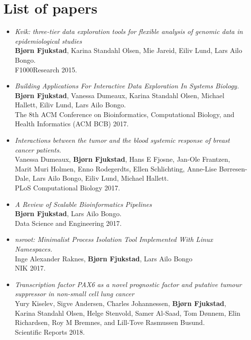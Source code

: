 \section{List of papers} 
\begin{itemize}
    \item
        \emph{Kvik: three-tier data exploration tools for flexible analysis of
        genomic data in epidemiological studies}
        \\
        \textbf{Bjørn Fjukstad}, Karina Standahl Olsen, Mie Jareid, Eiliv Lund,
        Lars Ailo Bongo. 
        \\ 
        F1000Research 2015.
        
    \item 
        \emph{Building Applications For Interactive Data Exploration In Systems
        Biology.}
        \\
        \textbf{Bjørn Fjukstad}, Vanessa Dumeaux, Karina Standahl Olsen, Michael
        Hallett, Eiliv Lund, Lars Ailo Bongo.  
        \\ 
        The 8th ACM Conference on Bioinformatics, Computational Biology, and
        Health Informatics (ACM BCB) 2017.

    \item 
        \emph{Interactions between the tumor and the blood systemic response of
        breast cancer patients.}
        \\ 
        Vanessa Dumeaux, \textbf{Bjørn Fjukstad}, Hans E Fjosne, Jan-Ole
        Frantzen, Marit Muri Holmen, Enno Rodegerdts, Ellen Schlichting,
        Anne-Lise Børresen-Dale, Lars Ailo Bongo, Eiliv Lund, Michael Hallett.
        \\ 
        PLoS Computational Biology 2017.

    \item \emph{A Review of Scalable Bioinformatics Pipelines} 
        \\
        \textbf{Bjørn Fjukstad}, Lars Ailo Bongo.
        \\ 
        Data Science and Engineering 2017.

        

    \item \emph{nsroot: Minimalist Process Isolation Tool Implemented With Linux
        Namespaces.}
        \\
        Inge Alexander Raknes, \textbf{Bjørn Fjukstad}, Lars Ailo Bongo 
        \\
        NIK 2017. 


    \item \emph{Transcription factor PAX6 as a novel prognostic factor and
        putative tumour suppressor in non-small cell lung cancer} 
        \\
        Yury Kiselev, Sigve Andersen, Charles Johannessen, \textbf{Bjørn
        Fjukstad}, Karina Standahl Olsen, Helge Stenvold, Samer Al-Saad, Tom
        Dønnem, Elin Richardsen, Roy M Bremnes, and Lill-Tove Rasmussen Busund. 
        \\
        Scientific Reports 2018. 


\end{itemize}
